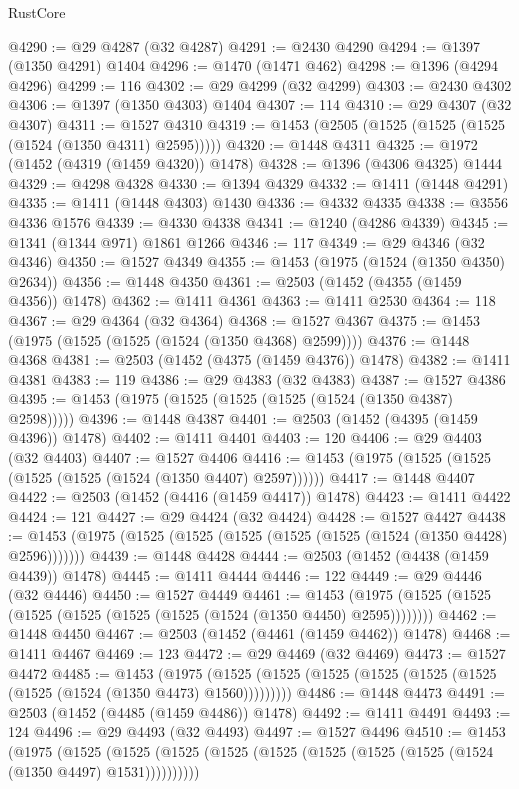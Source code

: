 \begin{lexlean}{RustCore}
\begin{coremodule}
{\begin{coremodule}
{{{{{{{{{{{{{{{{{{{{{{{{{{{{{{{{{{{{{{{{{{{{{@4290 := @29 @4287 (@32 @4287)
@4291 := @2430 @4290
@4294 := @1397 (@1350 @4291) @1404
@4296 := @1470 (@1471 @462)
@4298 := @1396 (@4294 @4296)
@4299 := 116
@4302 := @29 @4299 (@32 @4299)
@4303 := @2430 @4302
@4306 := @1397 (@1350 @4303) @1404
@4307 := 114
@4310 := @29 @4307 (@32 @4307)
@4311 := @1527 @4310
@4319 := @1453 (@2505 (@1525 (@1525 (@1525 (@1524 (@1350 @4311) @2595)))))
@4320 := @1448 @4311
@4325 := @1972 (@1452 (@4319 (@1459 @4320)) @1478)
@4328 := @1396 (@4306 @4325) @1444
@4329 := @4298 @4328
@4330 := @1394 @4329
@4332 := @1411 (@1448 @4291)
@4335 := @1411 (@1448 @4303) @1430
@4336 := @4332 @4335
@4338 := @3556 @4336 @1576
@4339 := @4330 @4338
@4341 := @1240 (@4286 @4339)
@4345 := @1341 (@1344 @971) @1861 @1266
@4346 := 117
@4349 := @29 @4346 (@32 @4346)
@4350 := @1527 @4349
@4355 := @1453 (@1975 (@1524 (@1350 @4350) @2634))
@4356 := @1448 @4350
@4361 := @2503 (@1452 (@4355 (@1459 @4356)) @1478)
@4362 := @1411 @4361
@4363 := @1411 @2530
@4364 := 118
@4367 := @29 @4364 (@32 @4364)
@4368 := @1527 @4367
@4375 := @1453 (@1975 (@1525 (@1525 (@1524 (@1350 @4368) @2599))))
@4376 := @1448 @4368
@4381 := @2503 (@1452 (@4375 (@1459 @4376)) @1478)
@4382 := @1411 @4381
@4383 := 119
@4386 := @29 @4383 (@32 @4383)
@4387 := @1527 @4386
@4395 := @1453 (@1975 (@1525 (@1525 (@1525 (@1524 (@1350 @4387) @2598)))))
@4396 := @1448 @4387
@4401 := @2503 (@1452 (@4395 (@1459 @4396)) @1478)
@4402 := @1411 @4401
@4403 := 120
@4406 := @29 @4403 (@32 @4403)
@4407 := @1527 @4406
@4416 := @1453 (@1975 (@1525 (@1525 (@1525 (@1525 (@1524 (@1350 @4407) @2597))))))
@4417 := @1448 @4407
@4422 := @2503 (@1452 (@4416 (@1459 @4417)) @1478)
@4423 := @1411 @4422
@4424 := 121
@4427 := @29 @4424 (@32 @4424)
@4428 := @1527 @4427
@4438 := @1453 (@1975 (@1525 (@1525 (@1525 (@1525 (@1525 (@1524 (@1350 @4428) @2596)))))))
@4439 := @1448 @4428
@4444 := @2503 (@1452 (@4438 (@1459 @4439)) @1478)
@4445 := @1411 @4444
@4446 := 122
@4449 := @29 @4446 (@32 @4446)
@4450 := @1527 @4449
@4461 := @1453 (@1975 (@1525 (@1525 (@1525 (@1525 (@1525 (@1525 (@1524 (@1350 @4450) @2595))))))))
@4462 := @1448 @4450
@4467 := @2503 (@1452 (@4461 (@1459 @4462)) @1478)
@4468 := @1411 @4467
@4469 := 123
@4472 := @29 @4469 (@32 @4469)
@4473 := @1527 @4472
@4485 := @1453
    (@1975 (@1525 (@1525 (@1525 (@1525 (@1525 (@1525 (@1525 (@1524 (@1350 @4473) @1560)))))))))
@4486 := @1448 @4473
@4491 := @2503 (@1452 (@4485 (@1459 @4486)) @1478)
@4492 := @1411 @4491
@4493 := 124
@4496 := @29 @4493 (@32 @4493)
@4497 := @1527 @4496
@4510 := @1453
    (@1975
      (@1525 (@1525 (@1525 (@1525 (@1525 (@1525 (@1525 (@1525 (@1524 (@1350 @4497) @1531))))))))))
}}}}}}}}}}}}}}}}}}}}}}}}}}}}}}}}}}}}}}}}}}}}}
\end{coremodule}}
\end{coremodule}
\end{lexlean}

